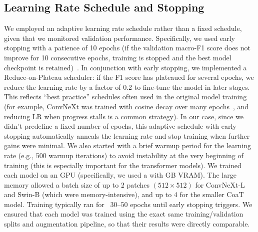 \documentclass[conference]{IEEEtran}
\begin{document}
\subsection*{Learning Rate Schedule and Stopping}
We employed an adaptive learning rate schedule rather than a fixed schedule, given that we monitored validation performance. Specifically, we used early stopping with a patience of 10 epochs (if the validation macro-F1 score does not improve for 10 consecutive epochs, training is stopped and the best model checkpoint is retained)~\cite{ivanova_artefact_2024}. In conjunction with early stopping, we implemented a Reduce-on-Plateau scheduler: if the F1 score has plateaued for several epochs, we reduce the learning rate by a factor of 0.2 to fine-tune the model in later stages. This reflects “best practice” schedules often used in the original model training (for example, ConvNeXt was trained with cosine decay over many epochs~\cite{liu_convnet_2022}, and reducing LR when progress stalls is a common strategy). In our case, since we didn't predefine a fixed number of epochs, this adaptive schedule with early stopping automatically anneals the learning rate and stop training when further gains were minimal. We also started with a brief warmup period for the learning rate (e.g., 500 warmup iterations) to avoid instability at the very beginning of training (this is especially important for the transformer models). We trained each model on an  GPU (specifically, we used a   with  GB VRAM). The large memory allowed a batch size of up to 2 patches $(512×512)$ for ConvNeXt-L and Swin-B (which were memory-intensive), and up to 4 for the smaller CoaT model. Training typically ran for ~30–50 epochs until early stopping triggers. We ensured that each model was trained using the exact same training/validation splits and augmentation pipeline, so that their results were directly comparable.
\end{document}
